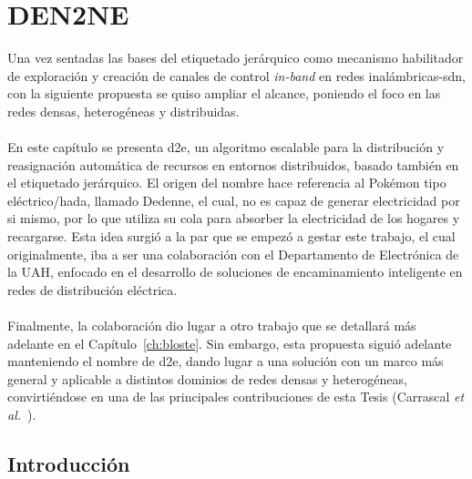 \chapter{DEN2NE}
\label{ch:den2ne}


Una vez sentadas las bases del etiquetado jerárquico como mecanismo habilitador de exploración y creación de canales de control \textit{in-band} en redes inalámbricas-\gls{sdn}, con la siguiente propuesta se quiso ampliar el alcance, poniendo el foco en las redes densas, heterogéneas y distribuidas.\\
\\
En este capítulo se presenta \gls{d2e}, un algoritmo escalable para la distribución y reasignación automática de recursos en entornos distribuidos, basado también en el etiquetado jerárquico. El origen del nombre hace referencia al Pokémon tipo eléctrico/hada, llamado Dedenne, el cual, no es capaz de generar electricidad por si mismo, por lo que utiliza su cola para absorber la electricidad de los hogares y recargarse. Esta idea surgió a la par que se empezó a gestar este trabajo, el cual originalmente, iba a ser una colaboración con el Departamento de Electrónica de la UAH, enfocado en el desarrollo de soluciones de encaminamiento inteligente en redes de distribución eléctrica.\\
\\
Finalmente, la colaboración dio lugar a otro trabajo que se detallará más adelante en el Capítulo~\ref{ch:bloste}. Sin embargo, esta propuesta siguió adelante manteniendo el nombre de \gls{d2e}, dando lugar a una solución con un marco más general y aplicable a distintos dominios de redes densas y heterogéneas, convirtiéndose en una de las principales contribuciones de esta Tesis (Carrascal \textit{et al.}~\cite{carrascal2024topology}).  

\section{Introducción}

